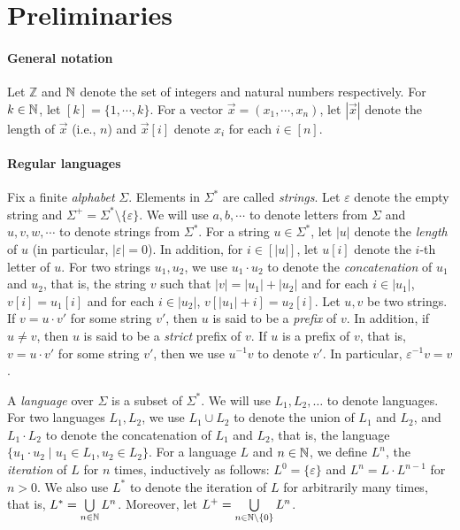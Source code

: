 
\section{Preliminaries}\label{sec-prel}

\paragraph{General notation} 
Let $\mathbb{Z}$ and $\mathbb{N}$ denote the set of integers and natural numbers respectively. For $k \in \mathbb{N}$, let $[k] = \{1,\cdots, k\}$. For a vector $\vec{x}=(x_1,\cdots, x_n)$, let $|\vec{x}|$ denote the length of $\vec{x}$ (i.e., $n$) and  $\vec{x}[i]$ denote $x_i$ for each $i \in [n]$. %


\paragraph{Regular languages}
Fix a finite \emph{alphabet} $\Sigma$. Elements in $\Sigma^*$ are called \emph{strings}. Let $\varepsilon$ denote the empty string and  $\Sigma^+ = \Sigma^* \setminus \{\varepsilon\}$. We will use $a,b,\cdots$ to denote letters from $\Sigma$ and $u, v, w, \cdots$ to denote strings from $\Sigma^*$. For a string $u \in \Sigma^*$, let $|u|$ denote the \emph{length} of $u$ (in particular, $|\varepsilon|=0$). In addition, for $i \in [|u|]$, let $u[i]$ denote the $i$-th letter of $u$. 
For two strings $u_1, u_2$, we use $u_1 \cdot u_2$ to denote the \emph{concatenation} of $u_1$ and $u_2$, that is, the string $v$ such that $|v|= |u_1| + |u_2|$ and for each $i \in |u_1|$, $v[i]= u_1[i]$ and for each $i \in |u_2|$, $v[|u_1|+i]=u_2[i]$. Let $u, v$ be two strings. If $v = u \cdot v'$ for some string $v'$, then $u$ is said to be a \emph{prefix} of $v$. In addition, if $u \neq v$, then $u$ is said to be a \emph{strict} prefix of $v$. If $u$ is a prefix of $v$, that is, $v = u \cdot v'$ for some string $v'$, then 
we use $u^{-1} v$ to denote $v'$. In particular, $\varepsilon^{-1} v = v$.

A \emph{language} over $\Sigma$ is a subset of $\Sigma^*$. We will use $L_1, L_2, \dots$ to denote languages. For two languages $L_1, L_2$, we use $L_1 \cup L_2$ to denote the union of $L_1$ and $L_2$, and $L_1 \cdot L_2$ to denote the concatenation of $L_1$ and $L_2$, that is, the language $\{u_1 \cdot u_2 \mid u_1 \in L_1, u_2 \in L_2\}$. For a language $L$ and $n \in \mathbb{N}$, we define $L^n$, the \emph{iteration} of $L$ for $n$ times, inductively as follows: $L^0=\{\varepsilon\}$ and $L^{n} =L \cdot L^{n-1}$ for $n > 0$. We also use $L^*$ to denote the iteration of $L$ for arbitrarily many times, that is, $L^* = \bigcup \limits_{n \in \mathbb{N}} L^n$. Moreover, let $L^+ = \bigcup \limits_{n \in \mathbb{N} \setminus \{0\}} L^n$.

